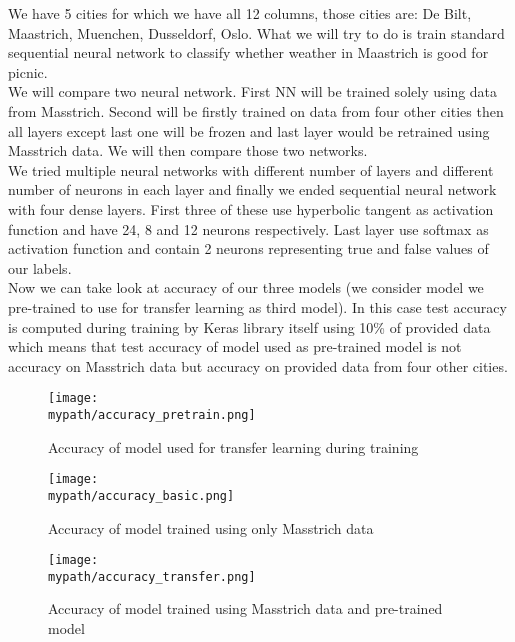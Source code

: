 \documentclass[a4paper]{article}
\begin{document}
	We have 5 cities for which we have all 12 columns, those cities are: De Bilt, Maastrich, Muenchen, Dusseldorf, Oslo. What we will try to do is train standard sequential neural network to classify whether weather in Maastrich is good for picnic. 
	\\
	
	We will compare two neural network. First NN will be trained solely using data from Masstrich. Second will be firstly trained on data from four other cities then all layers except last one will be frozen and last layer would be retrained using Masstrich data. We will then compare those two networks.  
	\\
	
	We tried multiple neural networks with different number of layers and different number of neurons in each layer and finally we ended sequential neural network with four dense layers. First three of these use hyperbolic tangent as activation function and have 24, 8 and 12 neurons respectively. Last layer use softmax as activation function and contain 2 neurons representing true and false values of our labels.    
	\\
	
	Now we can take look at accuracy of our three models (we consider model we pre-trained to use for transfer learning as third model). In this case test accuracy is computed during training by Keras library itself using 10\% of provided data which means that test accuracy of model used as pre-trained model is not accuracy on Masstrich data but accuracy on provided data from four other cities.
	
	
	\begin{figure}[h!]
		\centerline{\texttt{[image: \\mypath/accuracy\_pretrain.png]}}
		\caption{Accuracy of model used for transfer learning during training}
	\end{figure}

	\begin{figure}[h!]
		\centerline{\texttt{[image: \\mypath/accuracy\_basic.png]}}
		\caption{Accuracy of model trained using only Masstrich data}
	\end{figure}

	\begin{figure}[h!]
		\centerline{\texttt{[image: \\mypath/accuracy\_transfer.png]}}
		\caption{Accuracy of model trained using Masstrich data and pre-trained model}
	\end{figure}
\end{document}
